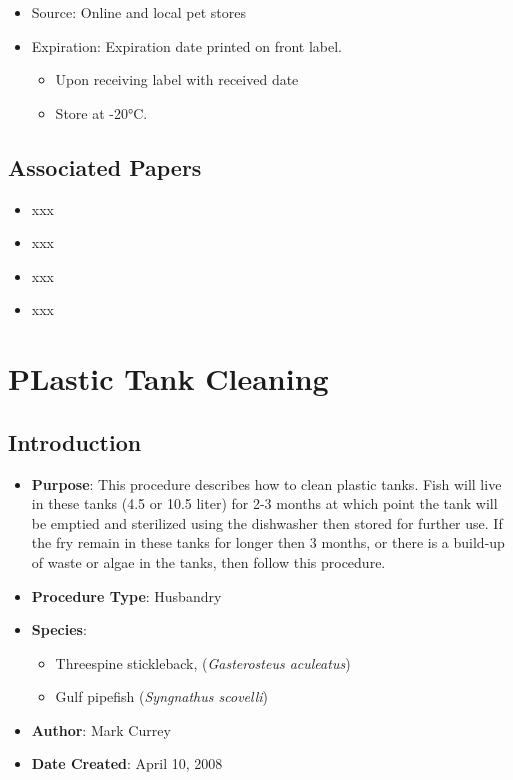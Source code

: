 \documentclass[
  letterpaper,
  DIV=11,
  numbers=noendperiod]{scrreprt}
\providecommand{\tightlist}{%
  \setlength{\itemsep}{0pt}\setlength{\parskip}{0pt}}\usepackage{longtable,booktabs,array}
\begin{document}
\begin{enumerate}
  \begin{itemize}
  \tightlist
  \item
    Source: Online and local pet stores
  \item
    Expiration: Expiration date printed on front label.

    \begin{itemize}
    \tightlist
    \item
      Upon receiving label with received date
    \item
      Store at -20°C.
    \end{itemize}
  \end{itemize}
\end{enumerate}

\hypertarget{associated-papers-5}{%
\section{Associated Papers}\label{associated-papers-5}}

\begin{itemize}
\tightlist
\item
  xxx
\item
  xxx
\item
  xxx
\item
  xxx
\end{itemize}

\hypertarget{sec-husbandry-plastic_tank_cleaning}{%
\chapter{PLastic Tank
Cleaning}\label{sec-husbandry-plastic_tank_cleaning}}

\hypertarget{introduction-12}{%
\section{Introduction}\label{introduction-12}}

\begin{itemize}
\tightlist
\item
  \textbf{Purpose}: This procedure describes how to clean plastic tanks.
  Fish will live in these tanks (4.5 or 10.5 liter) for 2-3 months at
  which point the tank will be emptied and sterilized using the
  dishwasher then stored for further use. If the fry remain in these
  tanks for longer then 3 months, or there is a build-up of waste or
  algae in the tanks, then follow this procedure.
\item
  \textbf{Procedure Type}: Husbandry
\item
  \textbf{Species}:

  \begin{itemize}
  \tightlist
  \item
    Threespine stickleback, (\emph{Gasterosteus aculeatus})
  \item
    Gulf pipefish (\emph{Syngnathus scovelli})
  \end{itemize}
\item
  \textbf{Author}: Mark Currey
\item
  \textbf{Date Created}: April 10, 2008
\end{itemize}
\end{document}

